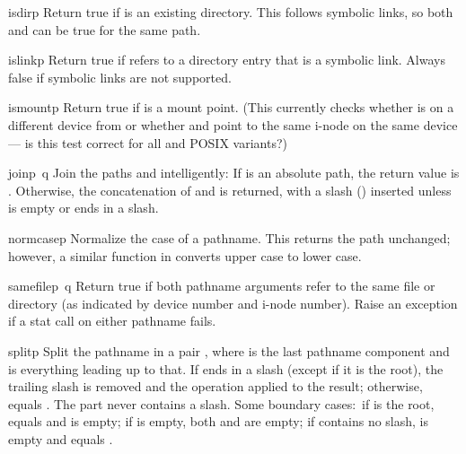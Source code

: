 \begin{funcdesc}{isdir}{p}
Return true if  is an existing directory.  This follows
symbolic links, so both  and  can be true for the same
path.
\end{funcdesc}

\begin{funcdesc}{islink}{p}
Return true if
refers to a directory entry that is a symbolic link.
Always false if symbolic links are not supported.
\end{funcdesc}

\begin{funcdesc}{ismount}{p}
Return true if  is a mount point.  (This currently checks whether
 is on a different device from  or whether
 and  point to the same i-node on the same
device --- is this test correct for all \UNIX{} and POSIX variants?)
\end{funcdesc}

\begin{funcdesc}{join}{p\, q}
Join the paths
and
 intelligently:
If
is an absolute path, the return value is
.
Otherwise, the concatenation of
and
is returned, with a slash () inserted unless
is empty or ends in a slash.
\end{funcdesc}

\begin{funcdesc}{normcase}{p}
Normalize the case of a pathname.  This returns the path unchanged;
however, a similar function in  converts upper case to
lower case.
\end{funcdesc}

\begin{funcdesc}{samefile}{p\, q}
Return true if both pathname arguments refer to the same file or directory
(as indicated by device number and i-node number).
Raise an exception if a stat call on either pathname fails.
\end{funcdesc}

\begin{funcdesc}{split}{p}
Split the pathname  in a pair , where
 is the last pathname component and  is
everything leading up to that.  If  ends in a slash (except if
it is the root), the trailing slash is removed and the operation
applied to the result; otherwise,  equals
.  The  part never contains a slash.  Some boundary
cases:\ if  is the root,  equals  and
 is empty; if  is empty, both  and
 are empty; if  contains no slash,  is
empty and  equals .
\end{funcdesc}


